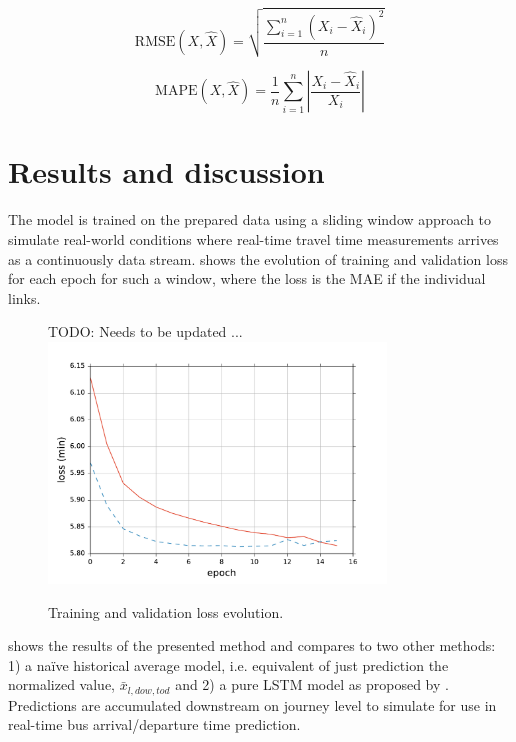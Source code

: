 \documentclass[preprint,12pt]{elsarticle}
\begin{document}
\begin{equation}
    \textrm{RMSE}(X, \widehat{X}) = \sqrt{\frac{\sum_{i = 1}^{n} \left(X_i - \widehat{X}_i \right)^2}{n}}
    \label{eq:rmse}
\end{equation}

\begin{equation}
    \textrm{MAPE}(X, \widehat{X}) = \frac{1}{n} \sum_{i = 1}^{n} \left| \frac{X_i - \widehat{X}_i}{X_i} \right| 
    \label{eq:mape} 
\end{equation}

\section{Results and discussion}
\label{sec:results}
The model is trained on the prepared data using a sliding window approach to simulate real-world conditions where real-time travel time measurements arrives as a continuously data stream.  shows the evolution of training and validation loss for each epoch for such a window, where the loss is the MAE if the individual links.

\begin{figure}
  \centering
  TODO: Needs to be updated ...
  \includegraphics[width=0.8\textwidth]{plots/conv_lstm_model_loss.pdf}
  \caption{Training and validation loss evolution.}
  \label{fig:loss}
\end{figure}

 shows the results of the presented method and compares to two other methods: 1) a naïve historical average model, i.e. equivalent of just prediction the normalized value, $\bar{x}_{l,\mathit{dow},\mathit{tod}}$ and 2) a pure LSTM model as proposed by \cite{YanjieDuan2016}. Predictions are accumulated downstream on journey level to simulate for use in real-time bus arrival/departure time prediction.
\end{document}
